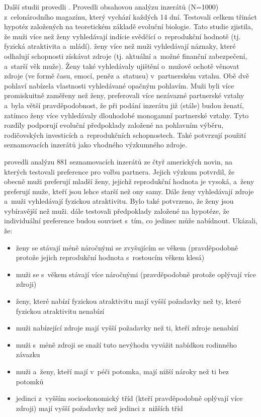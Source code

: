 \documentclass[a4paper, 12pt, notitlepage, oneside, numbers=noenddot]{report}
\begin{document}
Další studii provedli \citet{GreenlessMcGrew1994}. Provedli obsahovou
analýzu inzerátů (N=1000) z~celonárodního magazínu, který vychází
každých 14 dní. Testovali celkem třináct hypotéz založených na
teoretickém základě evoluční biologie. Tato studie zjistila, že muži
více než ženy vyhledávají indície svědčící o~reprodukční hodnotě
(tj. fyzická atraktivita a~mládí). ženy více než muži vyhledávají
náznaky, které odhalují schopnosti získávat zdroje (tj. aktuální
a~možné finanční zabezpečení, a~starší věk muže). Ženy také
vyhledávaly ujištění o~mužově ochotě věnovat zdroje (ve formě času,
emocí, peněz a~statusu) v~partnerském vztahu. Obě dvě pohlaví nabízela
vlastnosti vyhledávané opačným pohlavím. Muži byli více promiskuitně
zaměřeny než ženy, preferovali více nezávazné partnerské vztahy a~byla
větší pravděpodobnost, že při podání inzerátu již (stále) budou
ženatí, zatímco ženy více vyhledávaly dlouhodobé monogamní partnerské
vztahy. Tyto rozdíly podporují evoluční předpoklady založené na
pohlavním výběru, rodičovských investicích a~reprodukčních
schopnostech. Také potvrzují použití seznamovacích inzerátů jako
vhodného výzkumného zdroje.

\citet{WayfordDunbar1995} provedli analýzu 881 seznamovacích inzerátů
ze čtyř amerických novin, na kterých testovali preference pro volbu
partnera. Jejich výzkum potvrdil, že obecně muži preferují mladší
ženy, jejichž reprodukční hodnota je vysoká, a~ženy preferují muže,
kteří jsou lehce starší než ony samy. Dále ženy vyhledávají zdroje
a~muži vyhledávají fyzickou atraktivitu. Bylo také potvrzeno, že ženy
jsou vybíravější než muži. \citet{WayfordDunbar1995} dále testovali
předpoklady založené na hypotéze, že individuální preference budou
souviset s~tím, co jedinec může nabídnout. Ukázali, že:

\begin{itemize}
\item ženy se stávají méně náročnými se zvyšujícím se věkem
  (pravděpodobně protože jejich reprodukční hodnota s~rostoucím věkem
  klesá)
\item muži se s~věkem stávají více náročnými (pravděpodobně protože
  oplývají více zdroji)
\item ženy, které nabízí fyzickou atraktivitu mají vyšší požadavky než
  ty, které fyzickou atraktivitu nenabízí
\item muži nabízející zdroje mají vyšší požadavky než ti, kteří zdroje
  nenabízí
\item muži s~méně zdroji se snaží tuto nevýhodu vyvážit nabídkou
  rodinného závazku
\item muži a~ženy, kteří mají v~péči potomka, mají nižší nároky než ti
  bez potomků
\item jedinci z~vyšším socioekonomický tříd (kteří pravděpodobně
  oplývají více zdroji) mají vyšší požadavky než jedinci z~nižších
  tříd
\end{itemize}
\end{document}
